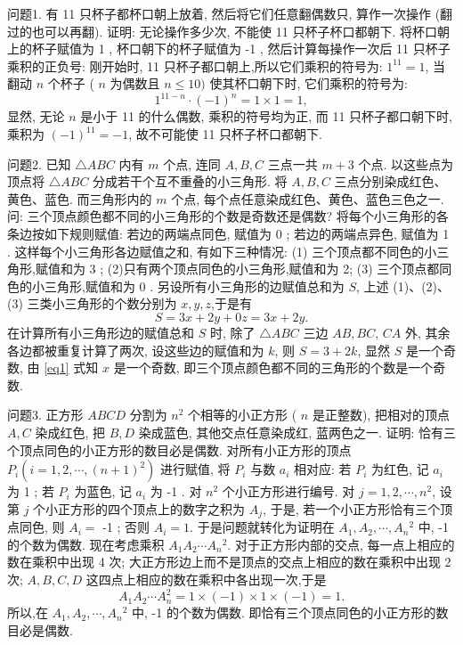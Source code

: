 
问题1. 有 11 只杯子都杯口朝上放着, 然后将它们任意翻偶数只, 算作一次操作 (翻过的也可以再翻). 证明: 无论操作多少次, 不能使 11 只杯子杯口都朝下.
将杯口朝上的杯子赋值为 1 , 杯口朝下的杯子赋值为 -1 , 然后计算每操作一次后 11 只杯子乘积的正负号:
刚开始时, 11 只杯子都口朝上,所以它们乘积的符号为: $1^{11}=1$, 当翻动 $n$ 个杯子 ( $n$ 为偶数且 $n \leqslant 10)$ 使其杯口朝下时, 它们乘积的符号为:
$$
1^{11-n} \cdot(-1)^n=1 \times 1=1,
$$
显然, 无论 $n$ 是小于 11 的什么偶数, 乘积的符号均为正, 而 11 只杯子都口朝下时,乘积为 $(-1)^{11}=-1$, 故不可能使 11 只杯子杯口都朝下.



问题2. 已知 $\triangle A B C$ 内有 $m$ 个点, 连同 $A, B, C$ 三点一共 $m+3$ 个点.
以这些点为顶点将 $\triangle A B C$ 分成若干个互不重叠的小三角形.
将 $A, B, C$ 三点分别染成红色、黄色、蓝色.
而三角形内的 $m$ 个点, 每个点任意染成红色、黄色、蓝色三色之一.
问: 三个顶点颜色都不同的小三角形的个数是奇数还是偶数?
将每个小三角形的各条边按如下规则赋值: 若边的两端点同色, 赋值为 0 ; 若边的两端点异色, 赋值为 1 . 这样每个小三角形各边赋值之和, 有如下三种情况:
(1) 三个顶点都不同色的小三角形,赋值和为 3 ;
(2)只有两个顶点同色的小三角形,赋值和为 2;
(3) 三个顶点都同色的小三角形,赋值和为 0 .
另设所有小三角形的边赋值总和为 $S$, 上述 (1)、(2)、(3) 三类小三角形的个数分别为 $x, y, z$,于是有
$$
S=3 x+2 y+0 z=3 x+2 y . \label{eq1}
$$
在计算所有小三角形边的赋值总和 $S$ 时, 除了 $\triangle A B C$ 三边 $A B, B C$, $C A$ 外, 其余各边都被重复计算了两次, 设这些边的赋值和为 $k$, 则 $S=3+2 k$, 显然 $S$ 是一个奇数, 由 \ref{eq1} 式知 $x$ 是一个奇数, 即三个顶点颜色都不同的三角形的个数是一个奇数.



问题3. 正方形 $A B C D$ 分割为 $n^2$ 个相等的小正方形 ( $n$ 是正整数), 把相对的顶点 $A, C$ 染成红色, 把 $B, D$ 染成蓝色, 其他交点任意染成红, 蓝两色之一.
证明: 恰有三个顶点同色的小正方形的数目必是偶数.
对所有小正方形的顶点 $P_i\left(i=1,2, \cdots,(n+1)^2\right)$ 进行赋值, 将 $P_i$ 与数 $a_i$ 相对应: 若 $P_i$ 为红色, 记 $a_i$ 为 1 ; 若 $P_i$ 为蓝色, 记 $a_i$ 为 -1 .
对 $n^2$ 个小正方形进行编号.
对 $j=1,2, \cdots, n^2$, 设第 $j$ 个小正方形的四个顶点上的数字之积为 $A_j$, 于是, 若一个小正方形恰有三个顶点同色, 则 $A_i=$ -1 ; 否则 $A_i=1$. 于是问题就转化为证明在 $A_1, A_2, \cdots, A_n{ }^2$ 中, -1 的个数为偶数.
现在考虑乘积 $A_1 A_2 \cdots A_n{ }^2$. 对于正方形内部的交点, 每一点上相应的数在乘积中出现 4 次; 大正方形边上而不是顶点的交点上相应的数在乘积中出现 2 次; $A, B, C, D$ 这四点上相应的数在乘积中各出现一次,于是
$$
A_1 A_2 \cdots A_n^2=1 \times(-1) \times 1 \times(-1)=1 .
$$
所以,在 $A_1, A_2, \cdots, A_n{ }^2$ 中, -1 的个数为偶数.
即恰有三个顶点同色的小正方形的数目必是偶数.



